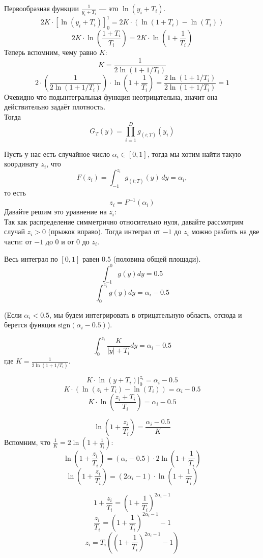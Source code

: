 Первообразная функции $\frac{1}{y_i + T_i}$ — это $\ln(y_i + T_i)$. 
$$2K \cdot \left[ \ln(y_i + T_i) \right]_0^1 = 2K \cdot (\ln(1 + T_i) - \ln(T_i))$$
$$2K \cdot \ln\left(\frac{1 + T_i}{T_i}\right) = 2K \cdot \ln\left(1 + \frac{1}{T_i}\right)$$
Теперь вспомним, чему равно $K$:
$$K = \frac{1}{2 \ln(1 + 1/T_i)}$$
$$2 \cdot \left( \frac{1}{2 \ln(1 + 1/T_i)} \right) \cdot \ln\left(1 + \frac{1}{T_i}\right) = \frac{2 \ln(1 + 1/T_i)}{2 \ln(1 + 1/T_i)} = 1$$
Очевидно что подынтегральная функция неотрицательна, значит она действительно задаёт плотность. \\

\noindent Тогда $$\displaystyle G_T(y)=\prod_{i=1}^D g_{(i;T)}(y_i)$$

Пусть у нас есть случайное число $\alpha_i \in [0, 1]$, тогда мы хотим найти такую координату $z_i$, что $$F(z_i) = \int_{-1}^{z_i} g_{(i;T)}(y) \, dy = \alpha_i,$$ то есть 
$$z_i = F^{-1}(\alpha_i)$$
Давайте решим это уравнение на $z_i$: \\

\noindent Так как распределение симметрично относительно нуля, давайте рассмотрим случай $z_i > 0$ (прыжок вправо). Тогда интеграл от $-1$ до $z_i$ можно разбить на две части: от $-1$ до $0$ и от $0$ до $z_i$.

Весь интеграл по $[0, 1]$ равен $0.5$ (половина общей площади).
$$\int_{-1}^{0} g(y) dy = 0.5$$
$$\int_{0}^{z_i} g(y) dy = \alpha_i - 0.5$$

(Если $\alpha_i < 0.5$, мы будем интегрировать в отрицательную область, отсюда и берется функция $\text{sign}(\alpha_i - 0.5)$).

$$\int_{0}^{z_i} \frac{K}{|y| + T_i} dy = \alpha_i - 0.5$$
где $K = \frac{1}{2 \ln(1 + 1/T_i)}$.

$$K \cdot \ln(y + T_i) \Big|_0^{z_i} = \alpha_i - 0.5$$
$$K \cdot (\ln(z_i + T_i) - \ln(T_i)) = \alpha_i - 0.5$$
$$K \cdot \ln\left(\frac{z_i + T_i}{T_i}\right) = \alpha_i - 0.5$$

$$\ln\left(1 + \frac{z_i}{T_i}\right) = \frac{\alpha_i - 0.5}{K}$$
Вспомним, что $\frac{1}{K} = 2 \ln(1 + \frac{1}{T_i})$:
$$\ln\left(1 + \frac{z_i}{T_i}\right) = (\alpha_i - 0.5) \cdot 2 \ln\left(1 + \frac{1}{T_i}\right)$$
$$\ln\left(1 + \frac{z_i}{T_i}\right) = (2\alpha_i - 1) \cdot \ln\left(1 + \frac{1}{T_i}\right)$$

$$1 + \frac{z_i}{T_i} = \left(1 + \frac{1}{T_i}\right)^{2\alpha_i - 1}$$
$$\frac{z_i}{T_i} = \left(1 + \frac{1}{T_i}\right)^{2\alpha_i - 1} - 1$$
$$z_i = T_i \left( \left(1 + \frac{1}{T_i}\right)^{2\alpha_i - 1} - 1 \right)$$

